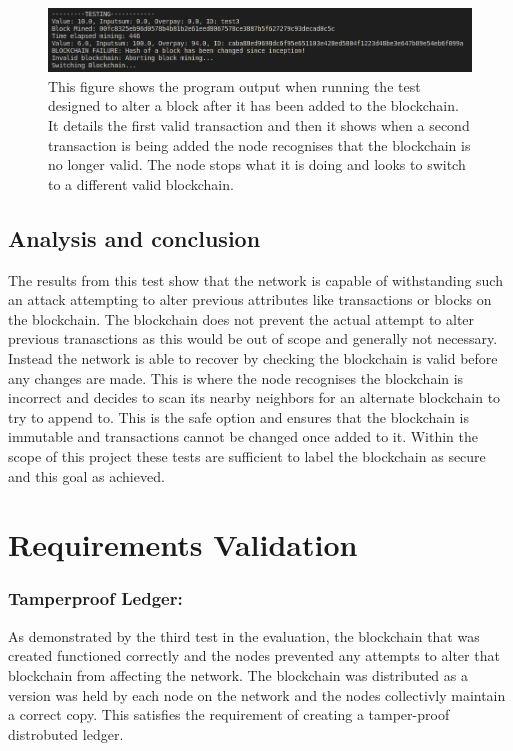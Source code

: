 \documentclass{l4proj}
\begin{document}
\begin{figure}[!ht]
    \centering
    \includegraphics[width=1\linewidth]{images/check3.png}    
    \caption
    {
        This figure shows the program output when running the test designed to alter a block after it has been added
        to the blockchain. It details the first valid transaction and then it shows when a second transaction is being
        added the node recognises that the blockchain is no longer valid. The node stops what it is doing and looks
        to switch to a different valid blockchain.
    }
    \label{fig:check3} 
\end{figure}

\subsection{Analysis and conclusion}
The results from this test show that the network is capable of withstanding such an attack attempting to alter previous
attributes like transactions or blocks on the blockchain. The blockchain does not prevent the actual attempt to alter
previous tranasctions as this would be out of scope and generally not necessary. Instead the network is able to recover
by checking the blockchain is valid before any changes are made. This is where the node recognises the blockchain is
incorrect and decides to scan its nearby neighbors for an alternate blockchain to try to append to. This is the safe
option and ensures that the blockchain is immutable and transactions cannot be changed once added to it. Within the
scope of this project these tests are sufficient to label the blockchain as secure and this goal as achieved.


\section{Requirements Validation}

\subsubsection{Tamperproof Ledger:}
As demonstrated by the third test in the evaluation, the blockchain that was created functioned correctly and the nodes
prevented any attempts to alter that blockchain from affecting the network. The blockchain was distributed as a version
was held by each node on the network and the nodes collectivly maintain a correct copy. This satisfies the requirement of creating a
tamper-proof distrobuted ledger.
\end{document}
